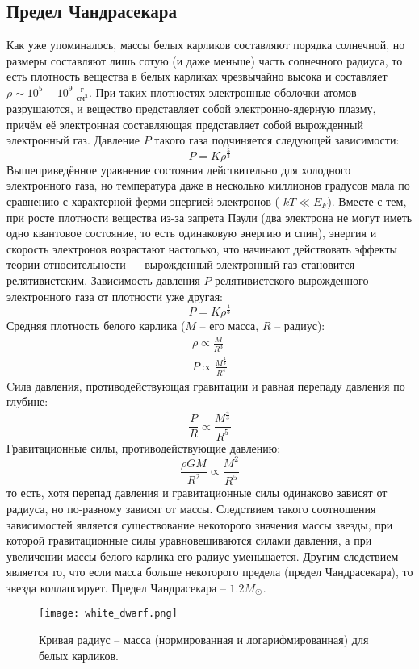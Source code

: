 \subsection{Предел Чандрасекара}
Как уже упоминалось, массы белых карликов составляют порядка солнечной, но размеры составляют лишь сотую (и даже меньше) часть солнечного радиуса, то есть плотность вещества в белых карликах чрезвычайно высока и составляет $\rho \sim 10^{5}-10^{9} \ \frac{\text{г}}{\text{см}^{3}} $. При таких плотностях электронные оболочки атомов разрушаются, и вещество представляет собой электронно-ядерную плазму, причём её электронная составляющая представляет собой вырожденный электронный газ. Давление $P$ такого газа подчиняется следующей зависимости:
\begin{equation*}
    P = K\rho^{\frac{5}{3}}
\end{equation*}
Вышеприведённое уравнение состояния действительно для холодного электронного газа, но температура даже в несколько миллионов градусов мала по сравнению с характерной ферми-энергией электронов (
$kT\ll E_{F}$). Вместе с тем, при росте плотности вещества из-за запрета Паули (два электрона не могут иметь одно квантовое состояние, то есть одинаковую энергию и спин), энергия и скорость электронов возрастают настолько, что начинают действовать эффекты теории относительности — вырожденный электронный газ становится релятивистским. Зависимость давления $P$ релятивистского вырожденного электронного газа от плотности уже другая:
\begin{equation*}
    P = K\rho^{\frac{4}{3}}
\end{equation*}
Средняя плотность белого карлика ($M$ -- его масса, $R$ -- радиус):
\begin{gather*}
    \rho \propto \frac{M}{R^{3}}\\
    P\propto \frac{M^{\frac{4}{3}}}{R^{4}}
\end{gather*}
Cила давления, противодействующая гравитации и равная перепаду давления по глубине:
\begin{equation*}
    \frac{P}{R}\propto \frac{M^{\frac{4}{3}}}{R^{5}}
\end{equation*}
Гравитационные силы, противодействующие давлению:
\begin{equation*}
    \frac{\rho G M}{R^{2}} \propto \frac{M^{2}}{R^{5}}
\end{equation*}
то есть, хотя перепад давления и гравитационные силы одинаково зависят от радиуса, но по-разному зависят от массы. Следствием такого соотношения зависимостей является существование некоторого значения массы звезды, при которой гравитационные силы уравновешиваются силами давления, а при увеличении массы белого карлика его радиус уменьшается. Другим следствием является то, что если масса больше некоторого предела (предел Чандрасекара), то звезда коллапсирует. Предел Чандрасекара -- $1.2M_{\Sun}$. 
\begin{figure}[H]
    \centering
    \texttt{[image: white\_dwarf.png]}
    \caption{Кривая радиус -- масса (нормированная и логарифмированная) для белых карликов.}
    \label{fig:wd.png}
\end{figure}
